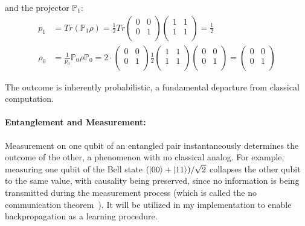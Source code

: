\documentclass[encoding=utf8,british]{tumphthesis}
\begin{document}
        and the projector $\mathbb{P}_1:$
        \begin{align*}
            p_1 &= Tr(\mathbb{P}_1 \rho) = \frac{1}{2} Tr \begin{pmatrix}0 & 0 \\ 0 & 1 \\ \end{pmatrix} \begin{pmatrix}1 & 1 \\ 1 & 1 \\ \end{pmatrix} = \frac{1}{2}
            \\
            \rho_0 &= \frac{1}{p_0}\mathbb{P}_0 \rho \mathbb{P}_0 = 2 \cdot \begin{pmatrix}0 & 0 \\ 0 & 1 \\ \end{pmatrix} \frac{1}{2} \begin{pmatrix}1 & 1 \\ 1 & 1 \\ \end{pmatrix} 
            \begin{pmatrix}0 & 0 \\ 0 & 1 \\ \end{pmatrix} = \begin{pmatrix}0 & 0 \\ 0 & 1 \\ \end{pmatrix}
        \end{align*}

        The outcome is inherently probabilistic, a fundamental departure from classical computation.

        \paragraph{Entanglement and Measurement:}
        Measurement on one qubit of an entangled pair instantaneously determines the outcome of the other, a phenomenon with no classical 
        analog. For example, measuring one qubit of the Bell state $(\left|00\right> + \left|11\right>)/\sqrt{2}$ collapses the other qubit to the 
        same value, with causality being preserved, since no information is being transmitted during the measurement process 
        (which is called the no communication theorem~\cite{No_comm_theor}).
        It will be utilized in my implementation to enable backpropagation as a learning procedure.
\end{document}
